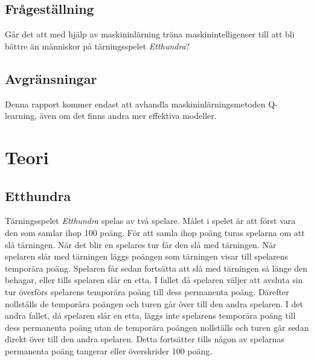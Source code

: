 \documentclass[12pt,a4paper]{article}
\begin{document}
    \subsection{Frågeställning}\label{subsec:fragestallning}
      Går det att med hjälp av maskininlärning träna maskinintelligenser till att bli bättre än människor på tärningsspelet \emph{Etthundra}?


    \subsection{Avgränsningar}\label{subsec:avgransningar}
      Denna rapport kommer endast att avhandla maskininlärningsmetoden Q-learning, även om det finns andra mer effektiva modeller.

    
  \cleardoublepage


  \section{Teori}\label{sec:teori}
    \subsection{Etthundra}\label{subsec:etthundra}
      Tärningsspelet \emph{Etthundra} spelas av två spelare. Målet i spelet är att först vara den som samlar ihop 100 poäng. För att samla ihop poäng turas spelarna om att slå tärningen. När det blir en spelares tur får den slå med tärningen. När spelaren slår med tärningen läggs poängen som tärningen visar till spelarens temporära poäng. Spelaren får sedan fortsätta att slå med tärningen så länge den behagar, eller tills spelaren slår en etta. I fallet då spelaren väljer att avsluta sin tur överförs spelarens temporära poäng till dess permanenta poäng. Därefter nollställs de temporära poängen och turen går över till den andra spelaren. I det andra fallet, då spelaren slår en etta, läggs inte spelarens temporära poäng till dess permanenta poäng utan de temporära poängen nollställs och turen går sedan direkt över till den andra spelaren. Detta fortsätter tills någon av spelarnas permanenta poäng tangerar eller överskrider 100 poäng.


\end{document}

